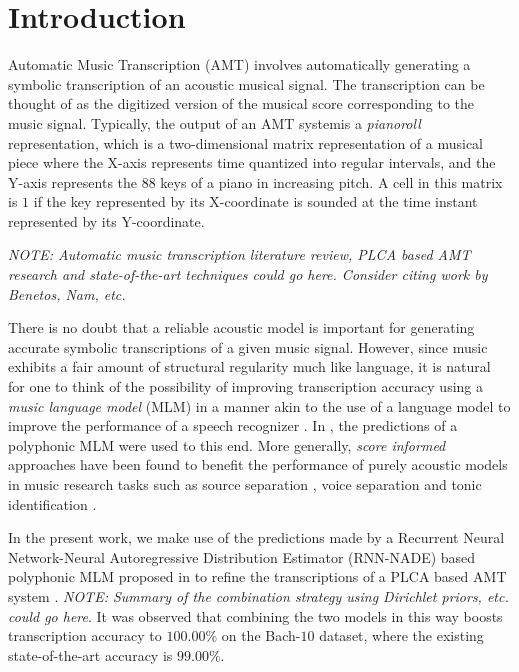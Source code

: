 \section{Introduction} 
\label{sec:introduction}

Automatic Music Transcription (AMT) involves automatically generating a symbolic transcription of an acoustic musical signal. The transcription can be thought of as the digitized version of the musical score corresponding to the music signal. Typically, the output of an AMT systemis a \textit{pianoroll} representation, which is a two-dimensional matrix representation of a musical piece where the X-axis represents time quantized into regular intervals, and the Y-axis represents the $88$ keys of a piano in increasing pitch. A cell in this matrix is $1$ if the key represented by its X-coordinate is sounded at the time instant represented by its Y-coordinate.

\textit{NOTE: Automatic music transcription literature review, PLCA based AMT research and state-of-the-art techniques could go here. Consider citing work by Benetos, Nam, etc.}

There is no doubt that a reliable acoustic model is important for generating accurate symbolic transcriptions of a given music signal. However, since music exhibits a fair amount of structural regularity much like language, it is natural for one to think of the possibility of improving transcription accuracy using a \textit{music language model} (MLM) in a manner akin to the use of a language model to improve the performance of a speech recognizer \cite{Rabiner1993}. In \cite{Boulanger-Lewandowski2012}, the predictions of a polyphonic MLM were used to this end. More generally, \textit{score informed} approaches have been found to benefit the performance of purely acoustic models in music research tasks such as source separation \cite{Ewert2012}, voice separation \cite{Ewert2011} and tonic identification \cite{Senturk2013}. %

In the present work, we make use of the predictions made by a Recurrent Neural Network-Neural Autoregressive Distribution Estimator (RNN-NADE) based polyphonic MLM proposed in \cite{Boulanger-Lewandowski2012} to refine the transcriptions of a PLCA based AMT system \cite{Benetos2012, Benetos2013}. \textit{NOTE: Summary of the combination strategy using Dirichlet priors, etc. could go here}. It was observed that combining the two models in this way boosts transcription accuracy to $100.00\%$ on the Bach-$10$ dataset, where the existing state-of-the-art accuracy is $99.00\%$.